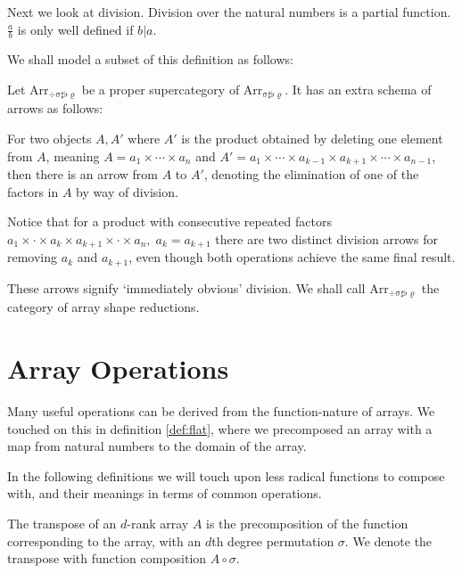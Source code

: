 \documentclass{DIKU-report-variant}
\newcommand\mrm[1]{\mathrm{#1}}
\newcommand\brm[1]{\bm{\mrm{#1}}}
\newcommand\Arr[1]{{\brm{Arr}_{\brm{#1}}}}
\newcommand\SSFR{\sigma\sharp\flat\varrho}
\newcommand\DSSFR{\div\sigma\sharp\flat\varrho}
\begin{document}
Next we look at division. Division over the natural numbers is
a partial function. \(\frac a b\) is only well defined if \(b|a\).

We shall model a subset of this definition as follows:

\begin{definition}
  \label{def:category-of-reductions}
  Let \(\Arr\DSSFR\) be a proper supercategory of \(\Arr\SSFR\).
  It has an extra schema of arrows as follows:
  
  For two objects \(A, A'\) where \(A'\) is the product obtained by deleting
  one element from \(A\), meaning \(A = a_1 \times\cdots\times a_n\) and
  \(A' = a_1 \times\cdots\times a_{k-1} \times a_{k+1}\times\cdots\times a_{n-1}\),
  then there is an arrow from \(A\) to \(A'\), denoting the elimination of one
  of the factors in \(A\) by way of division.

  \begin{center}
  \end{center}

  Notice that for a product with consecutive repeated
  factors \(a_1 \times \cdot \times a_k \times a_{k+1} \times \cdot \times a_n,\; a_k = a_{k+1}\)
  there are two distinct division arrows for removing \(a_k\) and \(a_{k+1}\), even
  though both operations achieve the same final result.

  These arrows signify `immediately obvious' division.
  We shall call \(\Arr\DSSFR\) the category of array shape reductions.
\end{definition}

\section{Array Operations}

\begin{remark}
  \label{rem:functions}
  Many useful operations can be derived from the function-nature of arrays. We touched
  on this in definition \ref{def:flat}, where we precomposed an array with a map
  from natural numbers to the domain of the array.

  In the following definitions we will touch upon less radical functions
  to compose with, and their meanings in terms of common operations.
\end{remark}

\begin{definition}
  \label{def:transpose}
  The transpose of an \(d\)-rank array \(A\) is the precomposition
  of the function corresponding to the array, with an \(d\)th degree permutation \(\sigma\).
  We denote the transpose with function composition \(A \circ \sigma\).
\end{definition}
\end{document}
